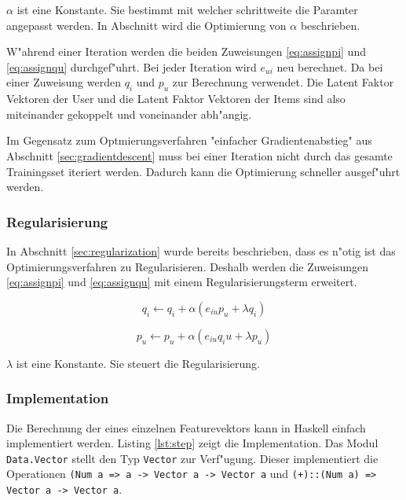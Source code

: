 \documentclass[a4paper, 12pt]{article}
\begin{document}
$\alpha$ ist eine Konstante. Sie bestimmt mit welcher schrittweite die Paramter angepasst werden. In Abschnitt \label{sec:results} wird die Optimierung von $\alpha$ beschrieben.

W"ahrend einer Iteration werden die beiden Zuweisungen \ref{eq:assignpi} und \ref{eq:assignqu} durchgef"uhrt. Bei jeder Iteration wird $e_{ui}$ neu berechnet. Da bei einer Zuweisung werden $q_i$ und $p_u$ zur Berechnung verwendet. Die Latent Faktor Vektoren der User und die Latent Faktor Vektoren der Items sind also miteinander gekoppelt und voneinander abh"angig.

Im Gegensatz zum Optmierungsverfahren "einfacher Gradientenabstieg" aus Abschnitt \ref{sec:gradientdescent} muss bei einer Iteration nicht durch das gesamte Trainingsset iteriert werden. Dadurch kann die Optimierung schneller ausgef"uhrt werden.

\subsubsection{Regularisierung}
\label{sec:regularization2}

In Abschnitt \ref{sec:regularization} wurde bereits beschrieben, dass es n"otig ist das Optimierungsverfahren zu Regularisieren. Deshalb werden die Zuweisungen \ref{eq:assignpi} und \ref{eq:assignqu} mit einem Regularisierungsterm erweitert.

\begin{equation}
  \label{eq:assign2}
  q_i \leftarrow q_i + \alpha (e_{iu} p_u + \lambda q_i)
\end{equation}

\begin{equation}
  \label{eq:assign3}
    p_u \leftarrow p_u + \alpha (e_{iu} q_iu + \lambda p_u)
\end{equation}

$\lambda$ ist eine Konstante. Sie steuert die Regularisierung. 

\subsubsection{Implementation}
\label{sec:sgdimpl}

Die Berechnung der eines einzelnen Featurevektors kann in Haskell einfach implementiert werden. Listing \ref{lst:step} zeigt die Implementation. Das Modul \verb|Data.Vector| stellt den Typ \verb|Vector| zur Verf"ugung. Dieser implementiert die Operationen \verb|(Num a => a -> Vector a -> Vector a| und \verb|(+)::(Num a) => Vector a -> Vector a|.
\end{document}
